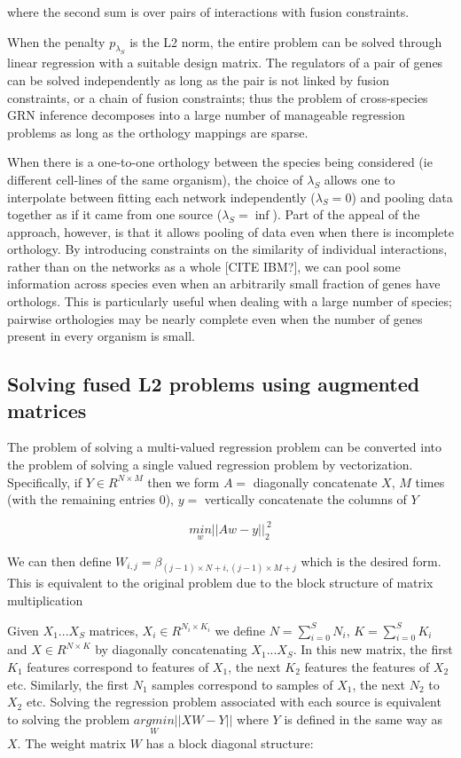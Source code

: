 \documentclass[11pt]{article}
\begin{document}
where the second sum is over pairs of interactions with fusion constraints. 

When the penalty $p_{\lambda_S}$ is the L2 norm, the entire problem can be solved through linear regression with a suitable design matrix. The regulators of a pair of genes can be solved independently as long as the pair is not linked by fusion constraints, or a chain of fusion constraints; thus the problem of cross-species GRN inference decomposes into a large number of manageable regression problems as long as the orthology mappings are sparse.


When there is a one-to-one orthology between the species being considered (ie different cell-lines of the same organism), the choice of $\lambda_S$ allows one to interpolate between fitting each network independently ($\lambda_S=0$) and pooling data together as if it came from one source ($\lambda_S=\inf$). Part of the appeal of the approach, however, is that it allows pooling of data even when there is incomplete orthology. By introducing constraints on the similarity of individual interactions, rather than on the networks as a whole [CITE IBM?], we can pool some information across species even when an arbitrarily small fraction of genes have orthologs. This is particularly useful when dealing with a large number of species; pairwise orthologies may be nearly complete even when the number of genes present in every organism is small. 

\subsection{Solving fused L2 problems using augmented matrices}
The problem of solving a multi-valued regression problem can be converted into the problem of solving a single valued regression problem by vectorization.
Specifically, if $Y \in R^{N \times M}$ then we form $A =$ diagonally concatenate $X$, $M$ times (with the remaining entries 0),
$y =$ vertically concatenate the columns of $Y$

$$\underset{w}{min} ||Aw - y||_2^{~2}$$

We can then define $W_{i,j} = \beta_{(j-1) \times N + i, (j-1) \times M + j}$ which is the desired form.
This is equivalent to the original problem due to the block structure of matrix multiplication

Given $X_1... X_S$ matrices, $X_i \in R^{N_i \times K_i}$ we define $N = \sum_{i=0}^S N_i$, $K = \sum_{i=0}^SK_i$ and $X \in R^{N \times K}$ by diagonally concatenating $X_1...X_S$.
In this new matrix, the first $K_1$ features correspond to features of $X_1$, the next $K_2$ features the features of $X_2$ etc.
Similarly, the first $N_1$ samples correspond to samples of $X_1$, the next $N_2$ to $X_2$ etc.
Solving the regression problem associated with each source is equivalent to solving the problem $\underset{W}{argmin}||XW-Y||$ where $Y$ is defined in the same way as $X$.
The weight matrix $W$ has a block diagonal structure:
\end{document}
